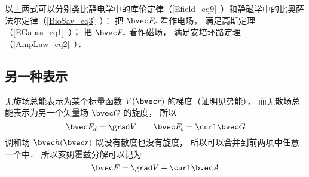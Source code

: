 以上两式可以分别类比静电学中的库伦定律（\autoref{Efield_eq9}~）和静磁学中的比奥萨法尔定律（\autoref{BioSav_eq3}~）： 把 $\bvec F_c$ 看作电场， 满足高斯定理（\autoref{EGauss_eq1}~）； 把 $\bvec F_c$ 看作磁场， 满足安培环路定理（\autoref{AmpLaw_eq2}~）．

\subsection{另一种表示}

无旋场总能表示为某个标量函数 $V(\bvec r)$ 的梯度（证明见势能）， 而无散场总能表示为另一个矢量场 $\bvec G$ 的旋度， 所以
\begin{equation}
\bvec F_{d} = \grad V\qquad \bvec F_{c} = \curl \bvec G
\end{equation}
调和场 $\bvec h(\bvec r)$ 既没有散度也没有旋度， 所以可以合并到前两项中任意一个中． 所以亥姆霍兹分解可以记为
\begin{equation}
\bvec F = \grad V + \curl \bvec A
\end{equation}


